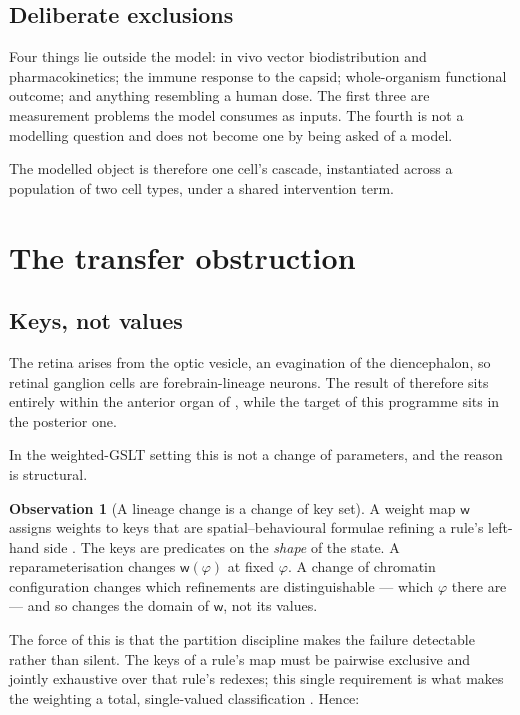 \documentclass[11pt,a4paper]{article}
\theoremstyle{plain}
\theoremstyle{definition}
\newtheorem{observation}[theorem]{Observation}
\theoremstyle{remark}
\newcommand{\wmap}{\mathsf{w}}
\begin{document}
\subsection{Deliberate exclusions}

Four things lie outside the model: in vivo vector biodistribution and
pharmacokinetics; the immune response to the capsid; whole-organism functional
outcome; and anything resembling a human dose. The first three are measurement
problems the model consumes as inputs. The fourth is not a modelling question
and does not become one by being asked of a model.

The modelled object is therefore one cell's cascade, instantiated across a
population of two cell types, under a shared intervention term.

\section{The transfer obstruction}\label{sec:transfer}

\subsection{Keys, not values}

The retina arises from the optic vesicle, an evagination of the diencephalon,
so retinal ganglion cells are forebrain-lineage neurons. The result of
\cite{LuEtAl} therefore sits entirely within the anterior organ of
\cite{TwoOrgans}, while the target of this programme sits in the posterior one.

In the weighted-GSLT setting this is not a change of parameters, and the
reason is structural.

\begin{observation}[A lineage change is a change of key set]\label{obs:keys}
A weight map $\wmap$ assigns weights to keys that are spatial--behavioural
formulae refining a rule's left-hand side \cite{WeightedGSLT}. The keys are
predicates on the \emph{shape} of the state. A reparameterisation changes
$\wmap(\varphi)$ at fixed $\varphi$. A change of chromatin configuration
changes which refinements are distinguishable --- which $\varphi$ there are ---
and so changes the domain of $\wmap$, not its values.
\end{observation}

The force of this is that the partition discipline makes the failure
detectable rather than silent. The keys of a rule's map must be pairwise
exclusive and jointly exhaustive over that rule's redexes; this single
requirement is what makes the weighting a total, single-valued classification
\cite{WeightedGSLT}. Hence:
\end{document}
